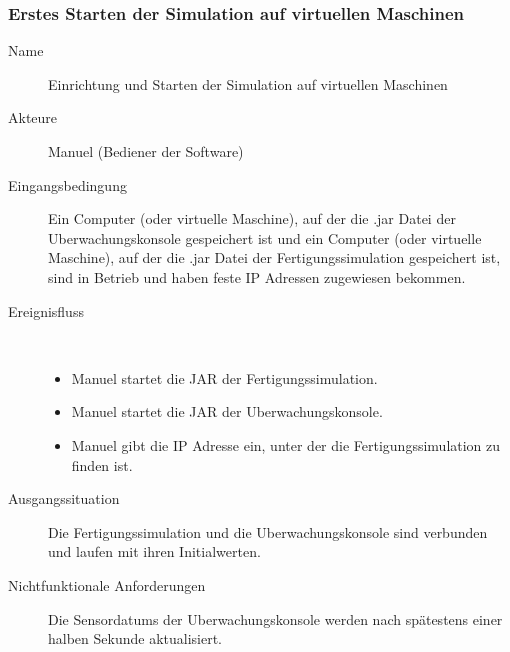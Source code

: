 \documentclass[parskip=full]{scrartcl}
\begin{document}
\subsubsection{Erstes Starten der Simulation auf virtuellen Maschinen}
\begin{description}
 \item[Name] Einrichtung und Starten der Simulation auf virtuellen Maschinen
 \item[Akteure] Manuel (Bediener der Software)
 \item[Eingangsbedingung] Ein Computer (oder virtuelle Maschine), auf der die .jar Datei der \gls{Uberwachungskonsole} gespeichert ist und ein Computer (oder virtuelle Maschine), auf der die .jar
 Datei der \gls{Fertigungssimulation} gespeichert ist, sind in Betrieb und haben feste IP Adressen zugewiesen bekommen.
 \item[Ereignisfluss]~\\
 \begin{itemize}[noitemsep]
  \item Manuel startet die JAR der \gls{Fertigungssimulation}.
  \item Manuel startet die JAR der \gls{Uberwachungskonsole}.
  \item Manuel gibt die IP Adresse ein, unter der die \gls{Fertigungssimulation} zu finden ist.
 \end{itemize}
 \item[Ausgangssituation] Die \gls{Fertigungssimulation} und die \gls{Uberwachungskonsole} sind verbunden und laufen mit ihren Initialwerten.
 \item[Nichtfunktionale Anforderungen] Die \glspl{Sensordatum} der \gls{Uberwachungskonsole} werden nach spätestens einer halben Sekunde aktualisiert.
\end{description}
 
\end{document}
